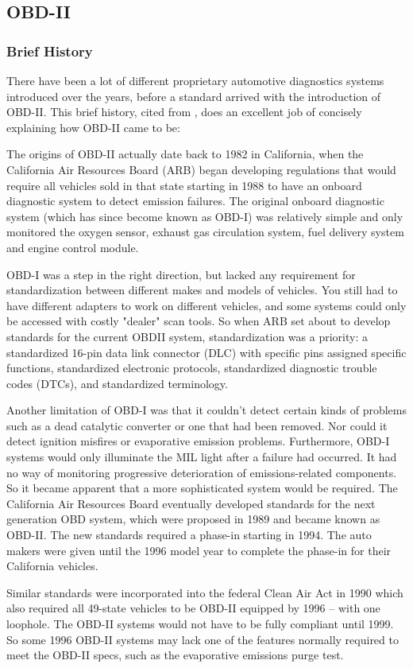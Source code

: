 \subsection{OBD-II}
\label{sec:obd}

\subsubsection{Brief History}
\label{subsec:obd:brief_history} 

There have been a lot of different proprietary automotive diagnostics systems introduced over the years, before a standard arrived with the introduction of OBD-II. This brief history, cited from \cite{OBDhistory}, does an excellent job of concisely explaining how OBD-II came to be:

\begin{displayquote}
	The origins of OBD-II actually date back to 1982 in California, when the California Air Resources Board (ARB) began developing regulations that would require all vehicles sold in that state starting in 1988 to have an onboard diagnostic system to detect emission failures. The original onboard diagnostic system (which has since become known as OBD-I) was relatively simple and only monitored the oxygen sensor, exhaust gas circulation system, fuel delivery system and engine control module.
	
	OBD-I was a step in the right direction, but lacked any requirement for standardization between different makes and models of vehicles. You still had to have different adapters to work on different vehicles, and some systems could only be accessed with costly "dealer" scan tools. So when ARB set about to develop standards for the current OBDII system, standardization was a priority: a standardized 16-pin data link connector (DLC) with specific pins assigned specific functions, standardized electronic protocols, standardized diagnostic trouble codes (DTCs), and standardized terminology.
	
	Another limitation of OBD-I was that it couldn't detect certain kinds of problems such as a dead catalytic converter or one that had been removed. Nor could it detect ignition misfires or evaporative emission problems. Furthermore, OBD-I systems would only illuminate the MIL light after a failure had occurred. It had no way of monitoring progressive deterioration of emissions-related components. So it became apparent that a more sophisticated system would be required. The California Air Resources Board eventually developed standards for the next generation OBD system, which were proposed in 1989 and became known as OBD-II. The new standards required a phase-in starting in 1994. The auto makers were given until the 1996 model year to complete the phase-in for their California vehicles.
	
	Similar standards were incorporated into the federal Clean Air Act in 1990 which also required all 49-state vehicles to be OBD-II equipped by 1996 -- with one loophole. The OBD-II systems would not have to be fully compliant until 1999. So some 1996 OBD-II systems may lack one of the features normally required to meet the OBD-II specs, such as the evaporative emissions purge test.
\end{displayquote}

